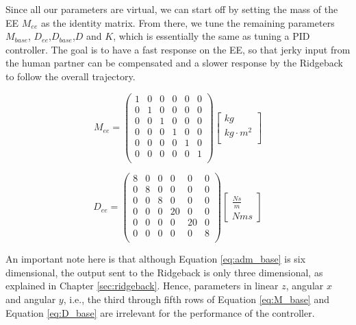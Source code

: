 Since all our parameters are virtual, we can start off by setting the mass of the EE $M_{ee}$ as the identity matrix. From there, we tune the remaining parameters $M_{base}$, $D_{ee}$,$D_{base}$,$D$ and $K$, which is essentially the same as tuning a PID controller. The goal is to have a fast response on the EE, so that jerky input from the human partner can be compensated and a slower response by the Ridgeback to follow the overall trajectory.

\begin{equation}
M_{ee} = \begin{pmatrix}
1 & 0 & 0 & 0 & 0 & 0 \\
0 & 1 & 0 & 0 & 0 & 0 \\
0 & 0 & 1 & 0 & 0 & 0 \\
0 & 0 & 0 & 1 & 0 & 0 \\
0 & 0 & 0 & 0 & 1 & 0 \\
0 & 0 & 0 & 0 & 0 & 1 \\
\end{pmatrix}
\begin{bmatrix}
kg \\
kg \cdot m^2 \\
\end{bmatrix}
\end{equation}

\begin{equation}
D_{ee} = \begin{pmatrix}
8 & 0 & 0 & 0 & 0 & 0 \\
0 & 8 & 0 & 0 & 0 & 0 \\
0 & 0 & 8 & 0 & 0 & 0 \\
0 & 0 & 0 & 20 & 0 & 0 \\
0 & 0 & 0 & 0 & 20 & 0 \\
0 & 0 & 0 & 0 & 0 & 8 \\
\end{pmatrix}
\begin{bmatrix}
\frac{N s}{m} \\
N m s
\end{bmatrix}
\end{equation}

An important note here is that although Equation \ref{eq:adm_base} is six dimensional, the output sent to the Ridgeback is only three dimensional, as explained in Chapter \ref{sec:ridgeback}. Hence, parameters in linear $z$, angular $x$ and angular $y$, i.e., the third through fifth rows of Equation \ref{eq:M_base} and Equation \ref{eq:D_base} are irrelevant for the performance of the controller.

